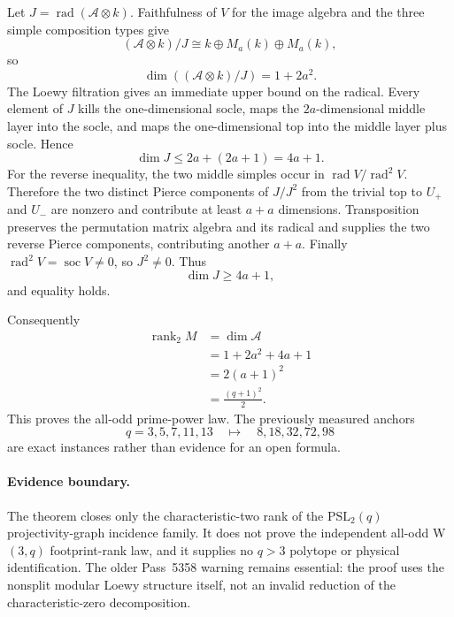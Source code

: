 Let $J=\operatorname{rad}(\mathcal A\otimes k)$.  Faithfulness of $V$ for the
image algebra and the three simple composition types give
\[
 \boxed{
 (\mathcal A\otimes k)/J\cong k\oplus M_a(k)\oplus M_a(k),
 }
\]
so
\[
 \dim((\mathcal A\otimes k)/J)=1+2a^2.
\]
The Loewy filtration gives an immediate upper bound on the radical.  Every
element of $J$ kills the one-dimensional socle, maps the $2a$-dimensional
middle layer into the socle, and maps the one-dimensional top into the
middle layer plus socle.  Hence
\[
 \dim J\le 2a+(2a+1)=4a+1.
\]
For the reverse inequality, the two middle simples occur in
$\operatorname{rad}V/\operatorname{rad}^2V$.  Therefore the two distinct Pierce
components of $J/J^2$ from the trivial top to $U_+$ and $U_-$ are nonzero and
contribute at least $a+a$ dimensions.  Transposition preserves the permutation
matrix algebra and its radical and supplies the two reverse Pierce components,
contributing another $a+a$.  Finally
$\operatorname{rad}^2V=\operatorname{soc}V\ne0$, so $J^2\ne0$.  Thus
\[
 \dim J\ge4a+1,
\]
and equality holds.

Consequently
\[
\begin{aligned}
 \operatorname{rank}_2M
 &=\dim\mathcal A\\
 &=1+2a^2+4a+1\\
 &=2(a+1)^2\\
 &=\boxed{\frac{(q+1)^2}{2}}.
\end{aligned}
\]
This proves the all-odd prime-power law.  The previously measured anchors
\[
 q=3,5,7,11,13
 \quad\longmapsto\quad
 8,18,32,72,98
\]
are exact instances rather than evidence for an open formula.

\paragraph{Evidence boundary.}
The theorem closes only the characteristic-two rank of the
$\mathrm{PSL}_2(q)$ projectivity-graph incidence family.  It does not prove the
independent all-odd W$(3,q)$ footprint-rank law, and it supplies no $q>3$
polytope or physical identification.  The older Pass~5358 warning remains
essential: the proof uses the nonsplit modular Loewy structure itself, not an
invalid reduction of the characteristic-zero decomposition.
